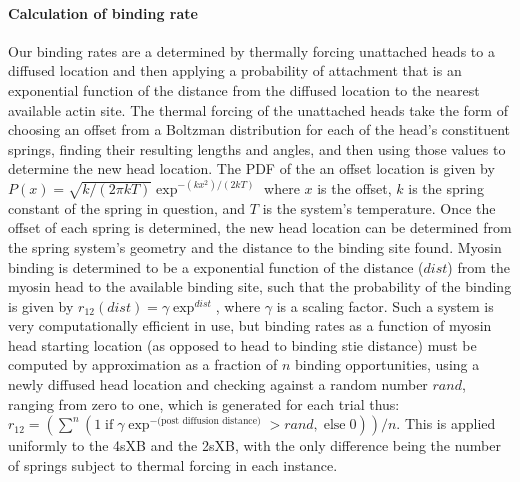 \documentclass[]{article}
\begin{document}
\paragraph{Calculation of binding rate} %
Our binding rates are a determined by thermally forcing unattached heads to a diffused location and then applying a probability of attachment that is an exponential function of the distance from the diffused location to the nearest available actin site.
The thermal forcing of the unattached heads take the form of choosing an offset from a Boltzman distribution for each of the head's constituent springs, finding their resulting lengths and angles, and then using those values to determine the new head location.
The PDF of the an offset location is given by  $P(x) = \sqrt{k / (2 \pi kT)} \exp^{-(k x^2)/(2 kT)}$ where $x$ is the offset, $k$ is the spring constant of the spring in question, and $T$ is the system's temperature.
Once the offset of each spring is determined, the new head location can be determined from the spring system's geometry and the distance to the binding site found.
Myosin binding is determined to be a exponential function of the distance ($dist$) from the myosin head to the available binding site, such that the probability of the binding is given by $r_{12}(dist) = \gamma \exp ^{dist}$, where $\gamma$ is a scaling factor.
Such a system is very computationally efficient in use, but binding rates as a function of myosin head starting location (as opposed to head to binding stie distance) must be computed by approximation as a fraction of $n$ binding opportunities, using a newly diffused head location and checking against a random number $rand$, ranging from zero to one, which is generated for each trial thus: 
$r_{12} = ( \sum^n ( 1\; \textrm{if}\; \gamma \exp^{-(\textrm{post diffusion distance)}}>rand ,\; \textrm{else}\; 0) )/n$.
This is applied uniformly to the 4sXB and the 2sXB, with the only difference being the number of springs subject to thermal forcing in each instance.
\end{document}
